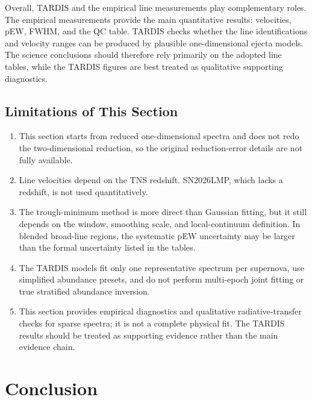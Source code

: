 \documentclass[11pt]{article}
\begin{document}
Overall, TARDIS and the empirical line measurements play complementary roles. The empirical measurements provide the main quantitative results: velocities, pEW, FWHM, and the QC table. TARDIS checks whether the line identifications and velocity ranges can be produced by plausible one-dimensional ejecta models. The science conclusions should therefore rely primarily on the adopted line tables, while the TARDIS figures are best treated as qualitative supporting diagnostics.

\subsection{Limitations of This Section}
\begin{enumerate}[leftmargin=1.4em]
    \item This section starts from reduced one-dimensional spectra and does not redo the two-dimensional reduction, so the original reduction-error details are not fully available.
    \item Line velocities depend on the TNS redshift. SN2026LMP, which lacks a redshift, is not used quantitatively.
    \item The trough-minimum method is more direct than Gaussian fitting, but it still depends on the window, smoothing scale, and local-continuum definition. In blended broad-line regions, the systematic pEW uncertainty may be larger than the formal uncertainty listed in the tables.
    \item The TARDIS models fit only one representative spectrum per supernova, use simplified abundance presets, and do not perform multi-epoch joint fitting or true stratified abundance inversion.
    \item This section provides empirical diagnostics and qualitative radiative-transfer checks for sparse spectra; it is not a complete physical fit. The TARDIS results should be treated as supporting evidence rather than the main evidence chain.
\end{enumerate}

\section{Conclusion}

\printbibliography[title={References}]
\end{document}
